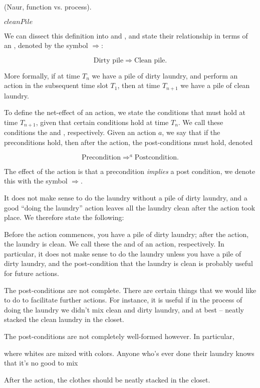 (Naur,
function vs. process).

\begin{codebox}
\li \Return $cleanPile$
\end{codebox}

We can dissect this definition into
 and , and state their relationship in
terms of an , denoted by the symbol $\Rightarrow$:

\begin{equation}
\text{Dirty pile}\Rightarrow \text{Clean pile}.
\end{equation}



More formally, if at time $T_n$ we
have a pile of dirty laundry, and perform an action in the subsequent time slot
$T_1$, then at time $T_{n+1}$ we have a pile of clean laundry.


To define the
net-effect of an action, we state the conditions that must hold at time
$T_{n+1}$, given that certain conditions hold at time $T_n$. We call these
conditions the  and , respectively. Given an
action $a$, we say that if the preconditions hold, then after the action, the
post-conditions must hold, denoted

\begin{equation}
\text{Precondition} \Rightarrow^a \text{Postcondition}.
\end{equation}


The effect
of the action is that a precondition \emph{implies} a post condition, we denote
this with the symbol $\Rightarrow$.

It does not make sense to do the laundry without a pile of dirty laundry, and a
good ``doing the laundry'' action leaves all the laundry clean after the action
took place. We therefore state the following:

 Before the action
commences, you have a pile of dirty laundry; after the action, the laundry is
clean. We call these the  and  of an action,
respectively. In particular, it does not make sense to do the laundry unless
you have a pile of dirty laundry, and the post-condition that the laundry is
clean is probably useful for future actions.

The post-conditions are not complete. There are certain things that we would
like to do to facilitate further actions. For instance, it is useful if in the
process of doing the laundry we didn't mix clean and dirty laundry, and at best
-- neatly stacked the clean laundry in the closet.


The post-conditions are not
completely well-formed however. In particular, 

where whites are mixed with
colors. Anyone who's ever done their laundry knows that it's no good to mix 

After the action, the clothes should be neatly stacked in the closet. 

